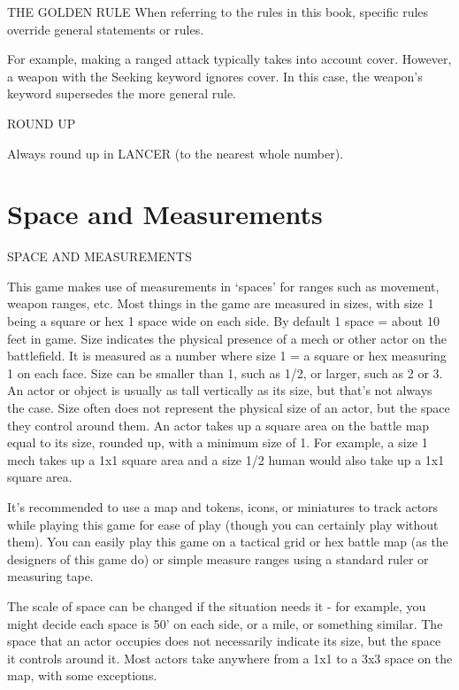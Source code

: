                                           THE GOLDEN RULE  
When referring to the rules in this book, specific rules override general statements or rules. 
 

For example, making a ranged attack typically takes into account cover. However, a weapon with  
the Seeking keyword ignores cover. In this case, the weapon’s keyword supersedes the more  
general rule.  

                                                 ROUND UP  

                                                                                                              


Always round up in LANCER (to the nearest whole number).  
\chapter{Space and Measurements}
                                 SPACE AND MEASUREMENTS  

This game makes use of measurements in ‘spaces’ for ranges such as movement, weapon  
ranges, etc. Most things in the game are measured in sizes, with size 1 being a square or hex 1  
space wide on each side. By default 1 space = about 10 feet in game. Size indicates the physical  
presence of a mech or other actor on the battlefield. It is measured as a number where size 1 = a  
square or hex measuring 1 on each face. Size can be smaller than 1, such as 1/2, or larger, such  
as 2 or 3. An actor or object is usually as tall vertically as its size, but that’s not always the case.  
Size often does not represent the physical size of an actor, but the space they control around  
them. An actor takes up a square area on the battle map equal to its size, rounded up, with a  
minimum size of 1. For example, a size 1 mech takes up a 1x1 square area and a size 1/2 human  
would also take up a 1x1 square area.  

It’s recommended to use a map and tokens, icons, or miniatures to track actors while playing this  
game for ease of play (though you can certainly play without them). You can easily play this game  
on a tactical grid or hex battle map (as the designers of this game do) or simple measure ranges  
using a standard ruler or measuring tape.  

The scale of space can be changed if the situation needs it - for example, you might decide each  
space is 50’ on each side, or a mile, or something similar. The space that an actor occupies does  
not necessarily indicate its size, but the space it controls around it. Most actors take anywhere  
from a 1x1 to a 3x3 space on the map, with some exceptions.
 

